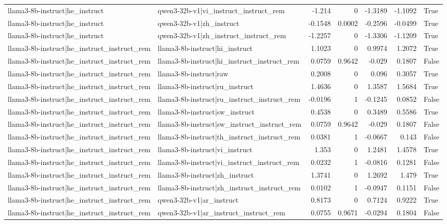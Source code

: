 \begin{table}
\begin{tabular}{l l r r r r l}
llama3-8b-instruct|he_instruct & qwen3-32b-v1|vi_instruct_instruct_rem & -1.214 & 0 & -1.3189 & -1.1092 & True \\
llama3-8b-instruct|he_instruct & qwen3-32b-v1|zh_instruct & -0.1548 & 0.0002 & -0.2596 & -0.0499 & True \\
llama3-8b-instruct|he_instruct & qwen3-32b-v1|zh_instruct_instruct_rem & -1.2257 & 0 & -1.3306 & -1.1209 & True \\
llama3-8b-instruct|he_instruct_instruct_rem & llama3-8b-instruct|hi_instruct & 1.1023 & 0 & 0.9974 & 1.2072 & True \\
llama3-8b-instruct|he_instruct_instruct_rem & llama3-8b-instruct|hi_instruct_instruct_rem & 0.0759 & 0.9642 & -0.029 & 0.1807 & False \\
llama3-8b-instruct|he_instruct_instruct_rem & llama3-8b-instruct|raw & 0.2008 & 0 & 0.096 & 0.3057 & True \\
llama3-8b-instruct|he_instruct_instruct_rem & llama3-8b-instruct|ru_instruct & 1.4636 & 0 & 1.3587 & 1.5684 & True \\
llama3-8b-instruct|he_instruct_instruct_rem & llama3-8b-instruct|ru_instruct_instruct_rem & -0.0196 & 1 & -0.1245 & 0.0852 & False \\
llama3-8b-instruct|he_instruct_instruct_rem & llama3-8b-instruct|sw_instruct & 0.4538 & 0 & 0.3489 & 0.5586 & True \\
llama3-8b-instruct|he_instruct_instruct_rem & llama3-8b-instruct|sw_instruct_instruct_rem & 0.0759 & 0.9642 & -0.029 & 0.1807 & False \\
llama3-8b-instruct|he_instruct_instruct_rem & llama3-8b-instruct|th_instruct_instruct_rem & 0.0381 & 1 & -0.0667 & 0.143 & False \\
llama3-8b-instruct|he_instruct_instruct_rem & llama3-8b-instruct|vi_instruct & 1.353 & 0 & 1.2481 & 1.4578 & True \\
llama3-8b-instruct|he_instruct_instruct_rem & llama3-8b-instruct|vi_instruct_instruct_rem & 0.0232 & 1 & -0.0816 & 0.1281 & False \\
llama3-8b-instruct|he_instruct_instruct_rem & llama3-8b-instruct|zh_instruct & 1.3741 & 0 & 1.2692 & 1.479 & True \\
llama3-8b-instruct|he_instruct_instruct_rem & llama3-8b-instruct|zh_instruct_instruct_rem & 0.0102 & 1 & -0.0947 & 0.1151 & False \\
llama3-8b-instruct|he_instruct_instruct_rem & qwen3-32b-v1|ar_instruct & 0.8173 & 0 & 0.7124 & 0.9222 & True \\
llama3-8b-instruct|he_instruct_instruct_rem & qwen3-32b-v1|ar_instruct_instruct_rem & 0.0755 & 0.9671 & -0.0294 & 0.1804 & False \\

\end{tabular}
\end{table}
